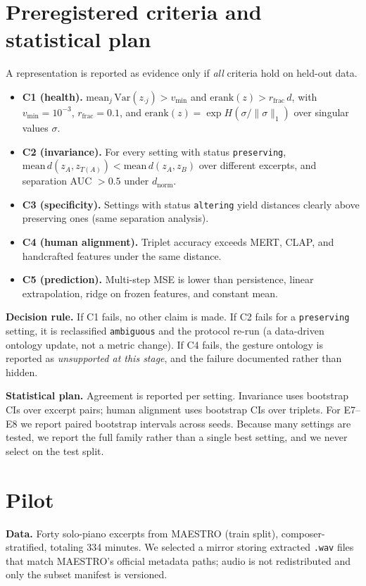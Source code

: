 \documentclass[11pt]{article}
\newcommand{\effrank}{\mathrm{erank}}
\begin{document}
\section{Preregistered criteria and statistical plan}
\label{sec:criteria}
A representation is reported as evidence only if \emph{all} criteria hold on
held-out data.
\begin{itemize}
  \item \textbf{C1 (health).} $\mathrm{mean}_j\,\mathrm{Var}(z_{\cdot j})>v_{\min}$
  and $\effrank(z)>r_{\text{frac}}\,d$, with $v_{\min}=10^{-3}$,
  $r_{\text{frac}}=0.1$, and
  $\effrank(z)=\exp H(\sigma/\lVert\sigma\rVert_1)$ over singular values $\sigma$.
  \item \textbf{C2 (invariance).} For every setting with status \texttt{preserving},
  $\mathrm{mean}\,d(z_A,z_{T(A)})<\mathrm{mean}\,d(z_A,z_B)$ over different
  excerpts, and separation AUC $>0.5$ under $d_{\text{norm}}$.
  \item \textbf{C3 (specificity).} Settings with status \texttt{altering} yield
  distances clearly above preserving ones (same separation analysis).
  \item \textbf{C4 (human alignment).} Triplet accuracy exceeds MERT, CLAP, and
  handcrafted features under the same distance.
  \item \textbf{C5 (prediction).} Multi-step MSE is lower than persistence,
  linear extrapolation, ridge on frozen features, and constant mean.
\end{itemize}
\textbf{Decision rule.} If C1 fails, no other claim is made. If C2 fails for a
\texttt{preserving} setting, it is reclassified \texttt{ambiguous} and the
protocol re-run (a data-driven ontology update, not a metric change). If C4 fails,
the gesture ontology is reported as \emph{unsupported at this stage}, and the
failure documented rather than hidden.

\textbf{Statistical plan.} Agreement is reported per setting. Invariance uses
bootstrap CIs over excerpt pairs; human alignment uses bootstrap CIs over
triplets. For E7--E8 we report paired bootstrap intervals across seeds. Because
many settings are tested, we report the full family rather than a single best
setting, and we never select on the test split.

\section{Pilot}
\label{sec:pilot}
\textbf{Data.} Forty solo-piano excerpts from MAESTRO \citep{hawthorne2019maestro}
(train split), composer-stratified, totaling 334 minutes. We selected a mirror
storing extracted \texttt{.wav} files that match MAESTRO's official metadata paths;
audio is not redistributed and only the subset manifest is versioned.
\end{document}
